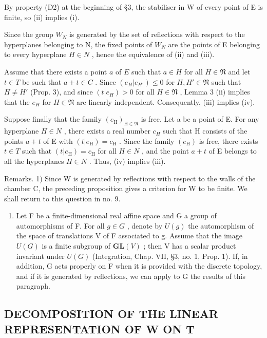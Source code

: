 By property (D2) at the beginning of §3, the stabiliser in W of every point of E is finite, so (ii) implies (i).

Since the group \(W_{N}\) is generated by the set of reflections with respect to the hyperplanes belonging to N, the fixed points of \(W_{N}\) are the points of E belonging to every hyperplane \(H \in N\) , hence the equivalence of (ii) and (iii).

Assume that there exists a point \(a\) of \(E\) such that \(a \in H\) for all \(H \in \mathfrak{N}\) and let \(t \in T\) be such that \(a + t \in C\) . Since \((e_H | e_{H'}) \leqslant 0\) for \(H, H' \in \mathfrak{N}\) such that \(H \neq H'\) (Prop. 3), and since \((t | e_H) > 0\) for all \(H \in \mathfrak{N}\) , Lemma 3 (ii) implies that the \(e_H\) for \(H \in \mathfrak{N}\) are linearly independent. Consequently, (iii) implies (iv).

Suppose finally that the family \((e_{\mathrm{H}})_{\mathrm{H}\in\mathfrak{N}}\) is free. Let a be a point of E. For any hyperplane \(H\in N\) , there exists a real number \(c_{H}\) such that H consists of the points \(a+t\) of E with \((t|e_{\mathrm{H}})=c_{\mathrm{H}}\) . Since the family \((e_{\mathrm{H}})\) is free, there exists \(t\in T\) such that \((t|e_{\mathrm{H}})=c_{\mathrm{H}}\) for all \(H\in N\) , and the point \(a+t\) of E belongs to all the hyperplanes \(H\in N\) . Thus, (iv) implies (iii).

Remarks. 1) Since W is generated by reflections with respect to the walls of the chamber C, the preceding proposition gives a criterion for W to be finite. We shall return to this question in no. 9.

\begin{enumerate}
\def\labelenumi{\arabic{enumi})}
\setcounter{enumi}{1}
\tightlist
\item
  Let F be a finite-dimensional real affine space and G a group of automorphisms of F. For all \(g \in G\) , denote by \(U(g)\) the automorphism of the space of translations V of F associated to g. Assume that the image \(U(G)\) is a finite subgroup of \(\mathbf{GL}(V)\) ; then V has a scalar product invariant under \(U(G)\) (Integration, Chap. VII, §3, no. 1, Prop. 1). If, in addition, G acts properly on F when it is provided with the discrete topology, and if it is generated by reflections, we can apply to G the results of this paragraph.
\end{enumerate}

\subsection{DECOMPOSITION OF THE LINEAR REPRESENTATION OF W ON T}

